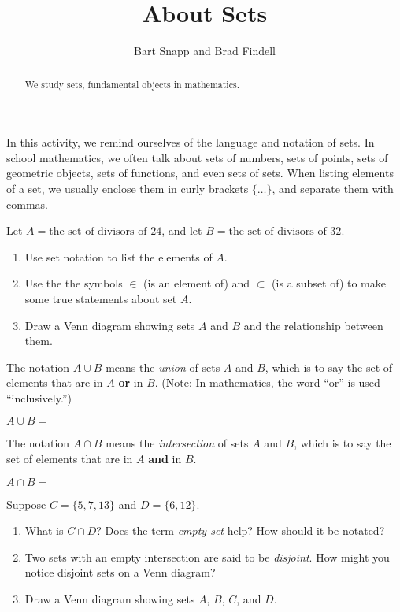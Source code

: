 \documentclass[nooutcomes]{ximera}
\title{About Sets}
\author{Bart Snapp and Brad Findell}
\begin{document}
\begin{abstract}
  We study sets, fundamental objects in mathematics.
\end{abstract}
\maketitle

In this activity, we remind ourselves of the language and notation of sets.  In school mathematics, we often talk about sets of numbers, sets of points, sets of geometric objects, sets of functions, and even sets of sets.  When listing elements of a set, we usually enclose them in curly brackets $\{\dots\}$, and separate them with commas. 


\begin{problem}
Let $A=\text{the set of divisors of 24}$, and let $B=\text{the set of divisors of 32}$.  
\begin{enumerate}
\item Use set notation to list the elements of $A$.  
\vfill
\item Use the the symbols $\in$ (is an element of) and $\subset$ (is a subset of) to make some true statements about set $A$. 
\vspace{0.3in}
\item Draw a Venn diagram showing sets $A$ and $B$ and the relationship between them.  
\vspace{1.5in}
\end{enumerate}
\end{problem}

\begin{problem}
The notation $A\cup B$ means the \emph{union} of sets $A$ and $B$, which is to say the set of elements that are in $A$ \textbf{or} in $B$.  (Note: In mathematics, the word ``or'' is used ``inclusively.'') 

$A\cup B = $ 
\vfill
\end{problem}

\begin{problem}
The notation $A\cap B$ means the \emph{intersection} of sets $A$ and $B$, which is to say the set of elements that are in $A$ \textbf{and} in $B$. 

$A\cap B = $
\vfill
\end{problem}

\begin{problem}
Suppose $C = \{5,7,13\}$ and $D = \{6,12\}$.  
\begin{enumerate}
\item What is $C\cap D$?  Does the term \emph{empty set} help?  How should it be notated?
\vspace{0.3in}
\item Two sets with an empty intersection are said to be \emph{disjoint}.  How might you notice disjoint sets on a Venn diagram?  
\vspace{0.5in}
\item Draw a Venn diagram showing sets $A$, $B$, $C$, and $D$. 
\vspace{1in}
\end{enumerate}
\end{problem}
\end{document}
